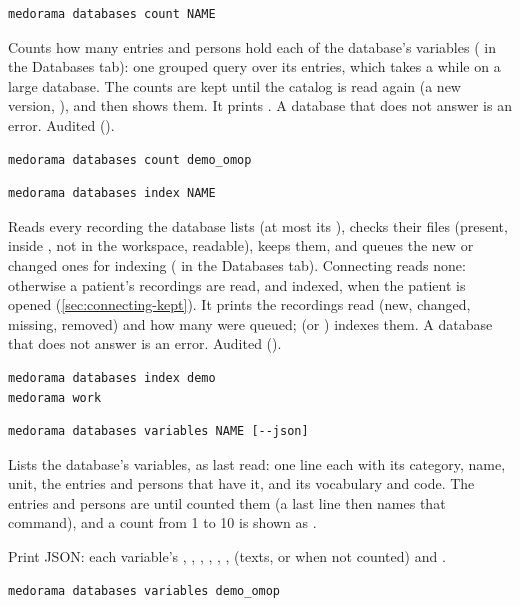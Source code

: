 \begin{lstlisting}[style=signature]
medorama databases count NAME
\end{lstlisting}
Counts how many entries and persons hold each of the database's variables ( in the
Databases tab): one grouped query over its entries, which takes a while on a large database.
The counts are kept until the catalog is read again (a new version, ),
and  then shows them. It prints . A
database that does not answer is an error. Audited ().
\begin{lstlisting}[style=shell]
medorama databases count demo_omop
\end{lstlisting}

\begin{lstlisting}[style=signature]
medorama databases index NAME
\end{lstlisting}
Reads every recording the database lists (at most its ), checks their files
(present, inside , not in the workspace, readable), keeps them, and queues the
new or changed ones for indexing ( in the Databases tab). Connecting
reads none: otherwise a patient's recordings are read, and indexed, when the patient is opened
(\cref{sec:connecting-kept}). It prints the recordings read (new, changed, missing, removed) and
how many were queued;  (or ) indexes them. A database that
does not answer is an error. Audited ().
\begin{lstlisting}[style=shell]
medorama databases index demo
medorama work
\end{lstlisting}

\begin{lstlisting}[style=signature]
medorama databases variables NAME [--json]
\end{lstlisting}
Lists the database's variables, as last read: one line each with its category, name, unit, the
entries and persons that have it, and its vocabulary and code. The entries and persons are
\code{-} until  counted them (a last line then names that command), and a
count from 1 to 10 is shown as .
\begin{params}
\item[--json] Print JSON: each variable's , , ,
  , , ,  (texts, or  when not
  counted) and .
\end{params}
\begin{lstlisting}[style=shell]
medorama databases variables demo_omop
\end{lstlisting}

